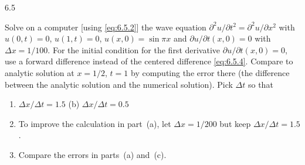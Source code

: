 \begin{exercises}{6.5}
\item Solve on a computer [using \eqref{eq:6.5.2}] the wave equation $\partial^2 u/\partial t^2 = \partial^2 u/\partial x^2$ with $u(0,t) = 0$, $u(1,t) = 0$, $u(x,0) = \sin\pi x$ and $\partial u/\partial t(x,0) = 0$ with $\Delta x = 1/100$.  For the initial condition for the first derivative $\partial u/\partial t(x,0) = 0$, use a forward difference instead of the centered difference \eqref{eq:6.5.4}.  Compare to analytic solution at $x = 1/2$, $t = 1$ by computing the error there (the difference between the analytic solution and the numerical solution).  Pick $\Delta t$ so that
\begin{enumerate}
\item[(a)] $\Delta x/\Delta t = 1.5$ \qquad (b) $\Delta x/\Delta t = 0.5$
\item[(c)] To improve the calculation in part~(a), let $\Delta x = 1/200$ but keep $\Delta x/\Delta t = 1.5$.
\item[(d)] Compare the errors in parts~(a) and~(c).
\end{enumerate}
\end{exercises}
